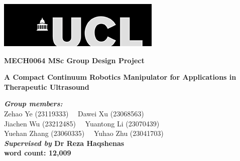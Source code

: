 \begin{titlepage}
\begin{center}
        \begin{center}
        \includegraphics[width=.70\textwidth]{Image/ucl_logo.png}
        \vspace{0.5cm}
        \end{center}
        \vspace*{0.1cm}
        \vspace{2cm}
        {\LARGE\textbf{MECH0064 MSc Group Design Project\\}}

        \vspace{2cm}
        {\huge\textbf{A Compact Continuum Robotics Manipulator for Applications in Therapeutic Ultrasound\\}}
        \vspace{0.25cm}

        \vfill

        \begin{flushleft}
        \textbf{\emph{Group members:}} \\
        Zehao Ye (23119333)~~ Dawei Xu (23068563)\\ 
        Jiachen Wu (23212485)~~ Yuantong Li (23070439)\\ 
        Yuehan Zhang (23060335)~~ Yuhao Zhu (23041703)\\ 
        \textbf{\emph{Supervised by} Dr Reza Haqshenas} \\
        \vspace{5mm}
        \textbf{word count: 12,009}
        \end{flushleft}
        \vspace{0.8cm}
\end{center}
\end{titlepage}

